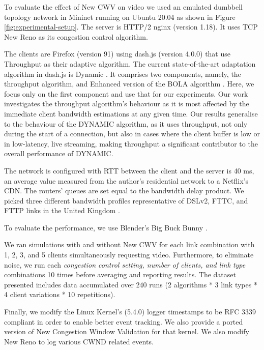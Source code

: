 \documentclass[10pt,sigconf,anonymous]{acmart}
\begin{document}
To evaluate the effect of New CWV on video we used an emulated dumbbell topology network in Mininet running on Ubuntu 20.04 as shown in Figure \ref{fig:experimental-setup}.
 The server is HTTP/2 nginx (version 1.18). It uses TCP New Reno as its congestion control algorithm.

 The clients are Firefox (version 91) using dash.js (version 4.0.0) that use Throughput as their adaptive algorithm. The current state-of-the-art adaptation algorithm in dash.js is Dynamic \cite{Spiteri-2019-from-theory-to-practice-sabre}. It comprises two components, namely, the throughput algorithm, and Enhanced version of the BOLA algorithm \cite{Spiteri-2016-BOLA}. Here, we focus only on the first component and use that for our experiments. Our work investigates the throughput algorithm's behaviour as it is most affected by the immediate client bandwidth estimations at any given time. Our results generalise to the behaviour of the DYNAMIC algorithm, as it uses throughput, not only during the start of a connection, but also in cases where the client buffer is low or in low-latency, live streaming, making throughput a significant contributor to the overall performance of DYNAMIC.


The network is configured with RTT between the client and the server is 40 ms, an average value measured from the author's residential network to a Netflix's CDN. The routers' queues are set equal to the bandwidth delay product. We picked three different bandwidth profiles representative of DSLv2, FTTC, and FTTP links in the United Kingdom \cite{online-ofcom-report}.

To evaluate the performance, we use Blender's Big Buck Bunny \cite{online-bbb}.

We ran simulations with and without New CWV for each link combination with 1, 2, 3, and 5 clients simultaneously requesting video. Furthermore, to eliminate noise, we run each \textit{congestion control setting, number of clients, and link type} combinations 10 times before averaging and reporting results. The dataset presented includes data accumulated over 240 runs (2 algorithms * 3 link types * 4 client variations * 10 repetitions). 

Finally, we modify the Linux Kernel's (5.4.0) logger timestamps to be RFC 3339 compliant in order to enable better event tracking. We also provide a ported version of New Congestion Window Validation \cite{rfc7661-2015-fairhurst-new-cwnd-validation} for that kernel. We also modify New Reno to log various CWND related events.
\end{document}

